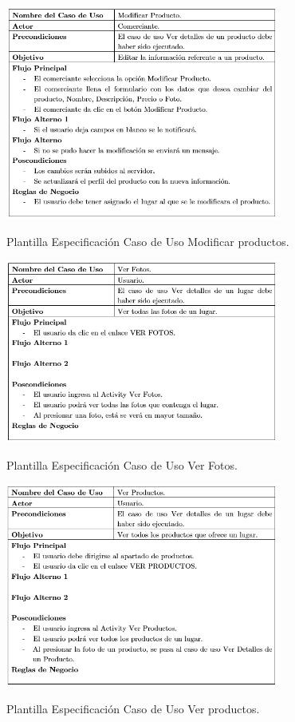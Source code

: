 \documentclass[12pt,letterpaper,openany]{book}
\begin{document}
\begin{table}[H]
\centering
\includegraphics[width=9cm]{./imagenes/PCU/modificar_producto}
\caption{Plantilla Especificación Caso de Uso Modificar productos.}
\end{table}

\begin{table}[H]
\centering
\includegraphics[width=9cm]{./imagenes/PCU/ver_fotos}
\caption{Plantilla Especificación Caso de Uso Ver Fotos.}
\end{table}

\begin{table}[H]
\centering
\includegraphics[width=9cm]{./imagenes/PCU/ver_productos}
\caption{Plantilla Especificación Caso de Uso Ver productos.}
\end{table}
\end{document}
